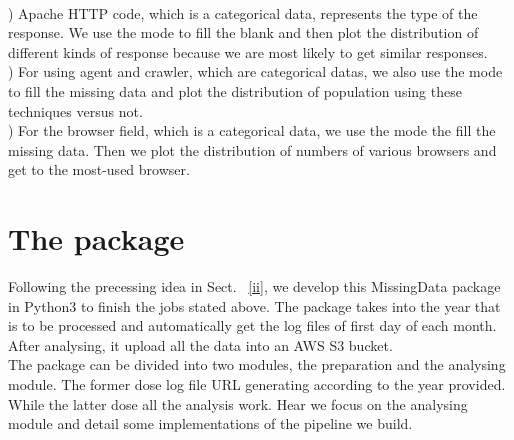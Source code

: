 \documentclass[conference]{IEEEtran}
\begin{document}
\\
) Apache HTTP code, which is a categorical data, represents the type of the response. We use the mode to fill the blank and then plot the distribution of different kinds of response because we are most likely to get similar responses.
\\
) For using agent and crawler, which are categorical datas, we also use the mode to fill the missing data and plot the distribution of population using these techniques versus not. 
\\
) For the browser field, which is a categorical data, we use the mode the fill the missing data. Then we plot the distribution of numbers of various browsers and get to the most-used browser. 
\\
%
\section{The package}\label{iii}
\indent Following the precessing idea in Sect. ~\ref{ii}, we develop this MissingData package in Python3 to finish the jobs stated above. The package takes into the year that is to be processed and automatically get the log files of first day of each month. After analysing, it upload all the data into an AWS S3 bucket.
\\
\indent The package can be divided into two modules, the preparation and the analysing module. The former dose log file URL generating according to the year provided. While the latter dose all the analysis work. Hear we focus on the analysing module and detail some implementations of the pipeline we build. 
\\
\indent 
%
\end{document}

